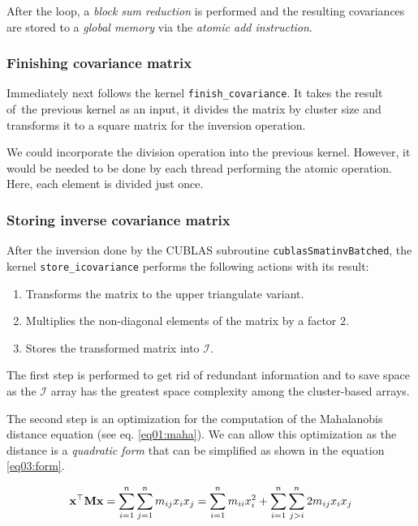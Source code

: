 After the loop, a \emph{block sum reduction} is performed and the resulting covariances are stored to a \emph{global memory} via the \emph{atomic add instruction}.

\subsubsection{Finishing covariance matrix}
Immediately next follows the kernel \texttt{finish\_covariance}. It takes the result of~the previous kernel as an input, it divides the matrix by cluster size and transforms it to a square matrix for the inversion operation.

We could incorporate the division operation into the previous kernel. However, it would be needed to be done by each thread performing the atomic operation. Here, each element is divided just once.

\subsubsection{Storing inverse covariance matrix}
After the inversion done by the CUBLAS subroutine \texttt{cublasSmatinvBatched}, the kernel \texttt{store\_icovariance} performs the following actions with its result:
\begin{enumerate}
	\item Transforms the matrix to the upper triangulate variant.
	\item Multiplies the non-diagonal elements of the matrix by a factor $2$.
	\item Stores the transformed matrix into $\mathcal{I}$.
\end{enumerate}

The first step is performed to get rid of redundant information and to save space as the $\mathcal{I}$ array has the greatest space complexity among the cluster-based arrays.

The second step is an optimization for the computation of the Mahalanobis distance equation (see eq. \ref{eq01:maha}). We can allow this optimization as the distance is a \emph{quadratic form} that can be simplified as shown in the equation \ref{eq03:form}.

\begin{equation}
\mathbf{x}^\top\mathbf{M}\mathbf{x} = \sum_{i=1}^{n}\sum_{j=1}^{n}{m_{ij}x_ix_j} = \sum_{i=1}^{n}{m_{ii}x_i^2} + \sum_{i=1}^{n}\sum_{j>i}^{n}{2m_{ij}x_ix_j}
\label{eq03:form}
\end{equation}


